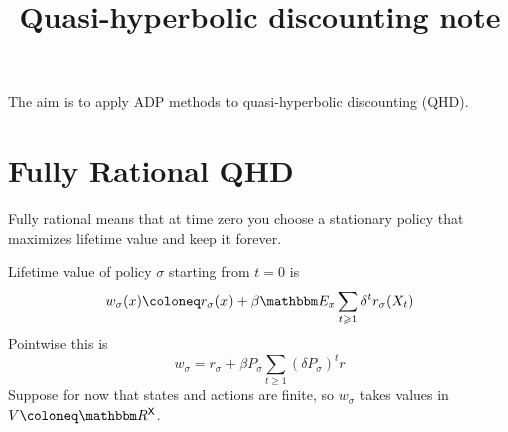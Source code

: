 \documentclass[12pt, reqno]{amsart}
\renewcommand{\geq}{\geqslant}
\newcommand{\1}{\mathbbm 1}
\newcommand{\RR}{\mathbbm R}
\newcommand{\EE}{\mathbbm E}
\newcommand{\Xsf}{\mathsf X}
\theoremstyle{plain}
\theoremstyle{definition}
\begin{document}
\title{Quasi-hyperbolic discounting note}


\maketitle


The aim is to apply ADP methods to quasi-hyperbolic discounting (QHD).  

\section{Fully Rational QHD}

Fully rational means that at time zero you choose a stationary policy that
maximizes lifetime value and keep it forever.

Lifetime value of policy $\sigma$ starting from $t=0$ is 
%
\begin{equation*}
    w_\sigma(x) 
    \coloneq
    r_\sigma(x) + \beta \EE_x 
        \sum_{t \geq 1} \delta^t r_\sigma(X_t)
\end{equation*}
%
Pointwise this is
%
\begin{equation*}
    w_\sigma = r_\sigma + \beta P_\sigma \sum_{t \geq 1} (\delta P_\sigma)^t r
\end{equation*}
%
Suppose for now that states and actions are finite, so $w_\sigma$ takes values
in $V \coloneq \RR^\Xsf$.
\end{document}
